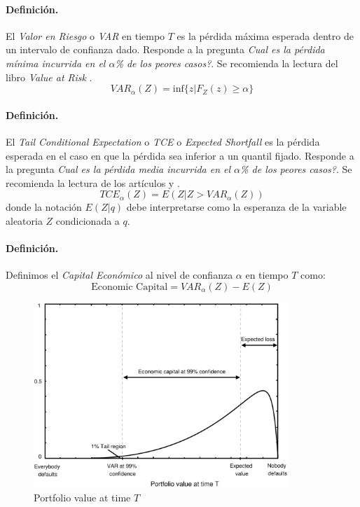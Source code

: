 \paragraph{Definici\'on.} El \emph{Valor en Riesgo} o
\emph{VAR} en tiempo $T$ es la p\'erdida m\'axima esperada dentro
de un intervalo de confianza dado. Responde a la pregunta \emph{Cual es la
p\'erdida m\'inima incurrida en el $\alpha$\% de los peores casos?}. Se recomienda
la lectura del libro \emph{Value at Risk} \cite{var:jorion}.
\begin{equation}
VAR_{\alpha}(Z) = \textrm{inf}\{z | F_Z(z) \geq \alpha \}
\end{equation}

\paragraph{Definici\'on.} El \emph{Tail Conditional Expectation}
 o \emph{TCE} o
\emph{Expected Shortfall} es la p\'erdida esperada
en el caso en que la p\'erdida sea inferior a un quantil fijado.
Responde a la pregunta \emph{Cual es la p\'erdida media incurrida en el
$\alpha$\% de los peores casos?}. Se recomienda la lectura de los art\'iculos
\cite{var:varbad} y \cite{var:eshortfall}.
\begin{equation}
TCE_{\alpha}(Z) = E(Z | Z > VAR_{\alpha}(Z))
\end{equation}
donde la notaci\'on $E(Z|q)$ debe interpretarse como la esperanza de la variable
aleatoria $Z$ condicionada a $q$.

\paragraph{Definici\'on.} Definimos el \emph{Capital Econ\'omico}
 al nivel de confianza $\alpha$ en tiempo $T$ como:
\begin{equation}
\textrm{Economic Capital} = VAR_{\alpha}(Z) - E(Z)
\end{equation}

\begin{figure}[!hb]
\begin{center}
\includegraphics[height=7cm, angle=0]{./images/creditvar.eps}
\caption{Portfolio value at time $T$}
\label{creditvar}
\end{center}
\end{figure}

